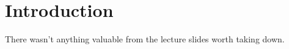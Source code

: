 \documentclass[11pt, a4paper]{article}
\begin{document}
\setcounter{page}{1}

\tableofcontents
\newpage
{}
\setcounter{page}{1}


\section{Introduction}
There wasn't anything valuable from the lecture slides worth taking down.
\end{document}
